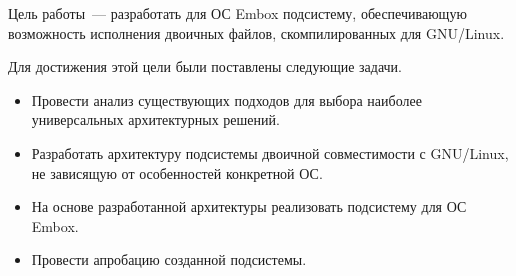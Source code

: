 
\label{sec:task}

Цель работы~--- разработать для ОС Embox подсистему, обеспечивающую возможность исполнения двоичных файлов, скомпилированных для GNU/Linux.

Для достижения этой цели были поставлены следующие задачи.
\begin{itemize}
  \item Провести анализ существующих подходов для выбора наиболее универсальных архитектурных решений.
  \item Разработать архитектуру подсистемы двоичной совместимости с GNU/Linux, не зависящую от особенностей конкретной ОС.
  \item На основе разработанной архитектуры реализовать подсистему для ОС Embox.
  \item Провести апробацию созданной подсистемы.
\end{itemize}
